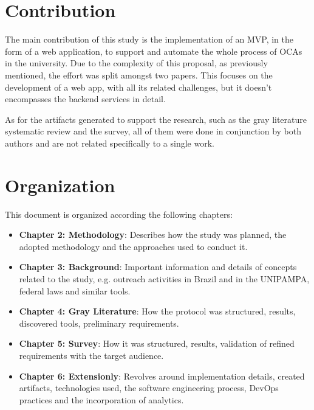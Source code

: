 \section{Contribution}\label{sec:contribution}

The main contribution of this study is the implementation of an \ac{MVP}, in the form of a web application, to support and automate the whole process of \aclp{OCA} in the university. Due to the complexity of this proposal, as previously mentioned, the effort was split amongst two papers. This focuses on the development of a web app, with all its related challenges, but it doesn't encompasses the backend services in detail.

As for the artifacts generated to support the research, such as the gray literature systematic review and the survey, all of them were done in conjunction by both authors and are not related specifically to a single work.

\section{Organization}\label{sec:organization}

This document is organized according the following chapters:

\begin{itemize}
  \item \textbf{Chapter 2: Methodology}: Describes how the study was planned, the adopted methodology and the approaches used to conduct it.
  \item \textbf{Chapter 3: Background}: Important information and details of concepts related to the study, e.g. outreach activities in Brazil and in the \acl{UNIPAMPA}, federal laws and similar tools.
  \item \textbf{Chapter 4: Gray Literature}: How the protocol was structured, results, discovered tools, preliminary requirements.
  \item \textbf{Chapter 5: Survey}: How it was structured, results, validation of refined requirements with the target audience.
  \item \textbf{Chapter 6: Extensionly}: Revolves around implementation details, created artifacts, technologies used, the software engineering process, DevOps practices and the incorporation of analytics.
\end{itemize}
